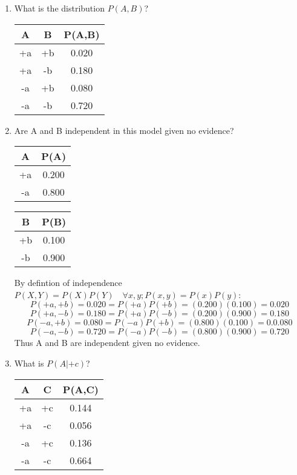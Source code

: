 \documentclass[12pt]{article}
\begin{document}
  \begin{enumerate}

  \item What is the distribution $P(A,B)$? 
  \begin{center}
  \begin{tabular}{|c|c|c|} \hline
  A  & B  & P(A,B) \\ \hline
  +a & +b & 0.020 \\ \hline
  +a & -b & 0.180 \\ \hline
  -a & +b & 0.080 \\ \hline
  -a & -b & 0.720 \\ \hline
  \end{tabular}
  \end{center}

  \item Are A and B independent in this model given no evidence?

  \begin{center}
  \begin{tabular}{|c|c|} \hline
  A  & P(A) \\ \hline
  +a & 0.200 \\ \hline
  -a & 0.800 \\ \hline
  \end{tabular}
  \begin{tabular}{|c|c|} \hline
  B  & P(B) \\ \hline
  +b & 0.100 \\ \hline
  -b & 0.900 \\ \hline
  \end{tabular}
  \end{center}

  By defintion of independence $P(X,Y) = P(X) P(Y) \quad \forall x,y; P(x,y)=P(x)P(y)$:
  \[
    P(+a,+b)=0.020=P(+a)P(+b)=(0.200)(0.100)=0.020
  \]
  \[
    P(+a,-b)=0.180=P(+a)P(-b)=(0.200)(0.900)=0.180
  \]
  \[
    P(-a,+b)=0.080=P(-a)P(+b)=(0.800)(0.100)=0.0.080
  \]
  \[
    P(-a,-b)=0.720=P(-a)P(-b)=(0.800)(0.900)=0.720
  \]
  Thus A and B are independent given no evidence.

  

  \item What is $P(A|+c)$?

  \begin{center}
  \begin{tabular}{|c|c|c|} \hline
  A  & C  & P(A,C) \\ \hline
  +a & +c & 0.144 \\ \hline
  +a & -c & 0.056 \\ \hline
  -a & +c & 0.136 \\ \hline
  -a & -c & 0.664 \\ \hline
  \end{tabular}
  \end{center}


\end{enumerate}
\end{document}
